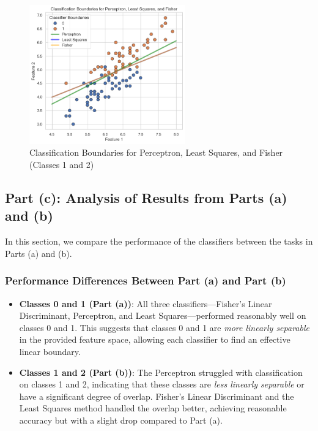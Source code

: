 \documentclass[a4paper, 11pt]{article}
\begin{document}
	\begin{figure}[h!]
		\centering
		\includegraphics[width=0.6\textwidth]{images/q4_b.png}
		\caption{Classification Boundaries for Perceptron, Least Squares, and Fisher (Classes 1 and 2)}
		\label{fig:decision_boundary_b}
	\end{figure}
	
	\subsection*{Part (c): Analysis of Results from Parts (a) and (b)}
	
	In this section, we compare the performance of the classifiers between the tasks in Parts (a) and (b).
	
	\subsubsection*{Performance Differences Between Part (a) and Part (b)}
	
	\begin{itemize}
		\item \textbf{Classes 0 and 1 (Part (a))}: All three classifiers—Fisher’s Linear Discriminant, Perceptron, and Least Squares—performed reasonably well on classes 0 and 1. This suggests that classes 0 and 1 are \textit{more linearly separable} in the provided feature space, allowing each classifier to find an effective linear boundary.
		\item \textbf{Classes 1 and 2 (Part (b))}: The Perceptron struggled with classification on classes 1 and 2, indicating that these classes are \textit{less linearly separable} or have a significant degree of overlap. Fisher’s Linear Discriminant and the Least Squares method handled the overlap better, achieving reasonable accuracy but with a slight drop compared to Part (a).
	\end{itemize}
	
\end{document}
